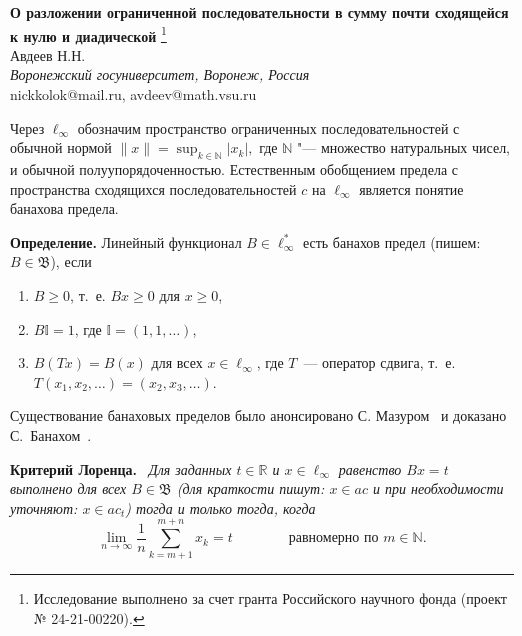 \documentclass[a4paper,14pt]{article}
\begin{document}
\pagestyle{fancy}
\fancyhead{}
\fancyfoot{}
\fancyfoot[R]{\footnotesize{}}
\renewcommand{\footrulewidth}{0.1 mm}

\begin{center}
\textbf{О разложении ограниченной последовательности в сумму почти сходящейся к нулю и диадической}%
\footnote{Исследование выполнено за счет гранта Российского научного фонда (проект № 24-21-00220).}\\
\vspace{\baselineskip}
Авдеев Н.Н.\\
\emph{Воронежский госуниверситет, Воронеж, Россия}\\nickkolok@mail.ru, avdeev@math.vsu.ru
\vspace{\baselineskip}\\
\end{center}
\vspace{\baselineskip}

\setcounter{equation}{0}
\setcounter{figure}{0}


Через $\ell_\infty$ обозначим пространство ограниченных последовательностей с обычной нормой
$
	\|x\| = \sup_{k\in\mathbb{N}} |x_k|
	,
$
где $\mathbb{N}$ "--- множество натуральных чисел, и обычной полуупорядоченностью.
Естественным обобщением предела с пространства сходящихся последовательностей $c$ на $\ell_\infty$
является понятие банахова предела.

\textbf{Определение.}
	Линейный функционал $B\in \ell_\infty^*$ есть банахов предел (пишем: $B \in \mathfrak{B}$),
	если
	\begin{enumerate}
		\item
			$B\geq0$, т.~е. $Bx \geq 0$ для $x \geq 0$,
		\item
			$B\mathbb{I}=1$, где $\mathbb{I} =(1,1,\ldots)$,
		\item
			$B(Tx)=B(x)$ для всех $x\in \ell_\infty$, где $T$~---
			оператор сдвига, т.~е. $T(x_1,x_2,\ldots)=(x_2,x_3,\ldots)$.
	\end{enumerate}

Существование банаховых пределов было анонсировано С. Мазуром~\cite{Mazur} и доказано С.~Банахом~\cite{banach1993theorie}.

\textbf{Критерий Лоренца.}~\cite{lorentz1948contribution}
{\sl
	Для заданных $t\in\mathbb R$ и $x\in\ell_\infty$ равенство $Bx=t$ выполнено для всех $B\in\mathfrak{B}$
	(для краткости пишут: $x\in ac$ и при необходимости уточняют: $x\in ac_t$)
	тогда и только тогда, когда
	\begin{equation*}
		\label{eq:crit_Lorentz}
		\lim_{n\to\infty} \frac{1}{n} \sum_{k=m+1}^{m+n} x_k = t
		\qquad\qquad\mbox{равномерно по $m\in\mathbb N$.}
	\end{equation*}
}
\end{document}
